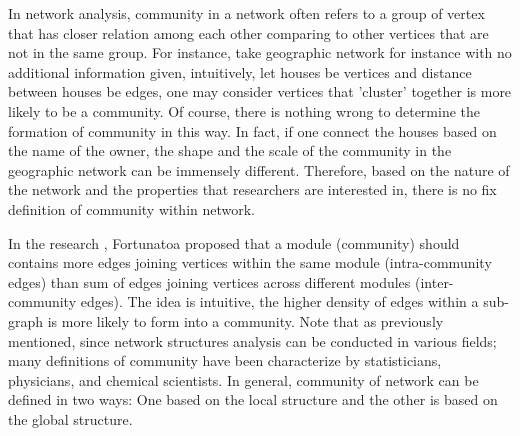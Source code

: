 \documentclass[12pt]{article}
\begin{document}

In network analysis, community in a network often refers to a group of vertex that has closer relation among each other comparing to other vertices that are not in the same group. For instance, take geographic network for instance with no additional information given, intuitively, let houses be vertices and distance between houses be edges, one may consider vertices that 'cluster' together is more likely to be a community. Of course, there is nothing wrong to determine the formation of community in this way. In fact, if one connect the houses based on the name of the owner, the shape and the scale of the community in the geographic network can be immensely different. Therefore, based on the nature of the network and the properties that researchers are interested in, there is no fix definition of community within network. 

\bigbreak

In the research \cite{19}, Fortunatoa proposed that a module (community) should contains more edges joining vertices within the same module (intra-community edges) than sum of edges joining vertices across different modules (inter-community edges). The idea is intuitive, the higher density of edges within a sub-graph is more likely to form into a community. Note that as previously mentioned, since network structures analysis can be conducted in various fields; many definitions of community have been characterize by statisticians, physicians, and chemical scientists. In general, community of network can be defined in two ways: One based on the local structure and the other is based on the global structure.

\bigbreak 
\end{document}
